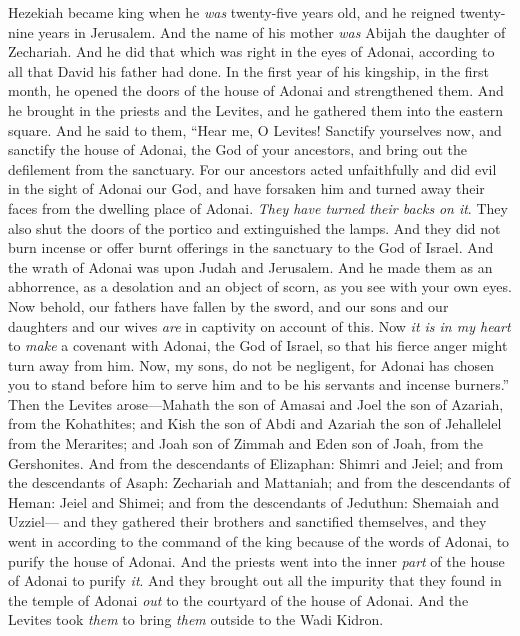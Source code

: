 \begin{biblechapter} %
 Hezekiah became king when he \textit{was} twenty-five years old, and he reigned twenty-nine years in Jerusalem. And the name of his mother \textit{was} Abijah the daughter of Zechariah.
\verse And he did that which was right in the eyes of Adonai, according to all that David his father had done.
\verse In the first year of his kingship, in the first month, he opened the doors of the house of Adonai and strengthened them.
\verse And he brought in the priests and the Levites, and he gathered them into the eastern square.
\verse And he said to them, “Hear me, O Levites! Sanctify yourselves now, and sanctify the house of Adonai, the God of your ancestors, and bring out the defilement from the sanctuary.
\verse For our ancestors acted unfaithfully and did evil in the sight of Adonai our God, and have forsaken him and turned away their faces from the dwelling place of Adonai. \textit{They have turned their backs} \textit{on it}.
\verse They also shut the doors of the portico and extinguished the lamps. And they did not burn incense or offer burnt offerings in the sanctuary to the God of Israel.
\verse And the wrath of Adonai was upon Judah and Jerusalem. And he made them as an abhorrence, as a desolation and an object of scorn, as you see with your own eyes.
\verse Now behold, our fathers have fallen by the sword, and our sons and our daughters and our wives \textit{are} in captivity on account of this.
\verse Now \textit{it is in my heart} to \textit{make} a covenant with Adonai, the God of Israel, so that his fierce anger might turn away from him.
\verse Now, my sons, do not be negligent, for Adonai has chosen you to stand before him to serve him and to be his servants and incense burners.”
\verse Then the Levites arose—Mahath the son of Amasai and Joel the son of Azariah, from the Kohathites; and Kish the son of Abdi and Azariah the son of Jehallelel from the Merarites; and Joah son of Zimmah and Eden son of Joah, from the Gershonites.
\verse And from the descendants of Elizaphan: Shimri and Jeiel; and from the descendants of Asaph: Zechariah and Mattaniah;
\verse and from the descendants of Heman: Jeiel and Shimei; and from the descendants of Jeduthun: Shemaiah and Uzziel—
\verse and they gathered their brothers and sanctified themselves, and they went in according to the command of the king because of the words of Adonai, to purify the house of Adonai.
\verse And the priests went into the inner \textit{part} of the house of Adonai to purify \textit{it}. And they brought out all the impurity that they found in the temple of Adonai \textit{out} to the courtyard of the house of Adonai. And the Levites took \textit{them} to bring \textit{them} outside to the Wadi Kidron.

\end{biblechapter}

